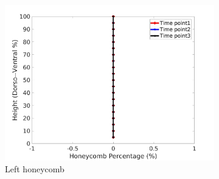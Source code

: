\begin{figure}[H]
\begin{subfigure}{.42\linewidth}
  \includegraphics[width=\linewidth,trim={{.0\wd0} {.0\wd0} {.0\wd0} {.0\wd0}},clip]{Appendix/Image_AppexA/DorsoToVentral/IPF9LeftLungHoneycombDiseaseDorsoToVentral.jpg} %
  \caption{Left honeycomb}
  \label{fig:IPF9DiseaseDorsoToVentral-e} 
\end{subfigure} 
\begin{subfigure}{.42\linewidth}%

\end{subfigure}
\end{figure}
